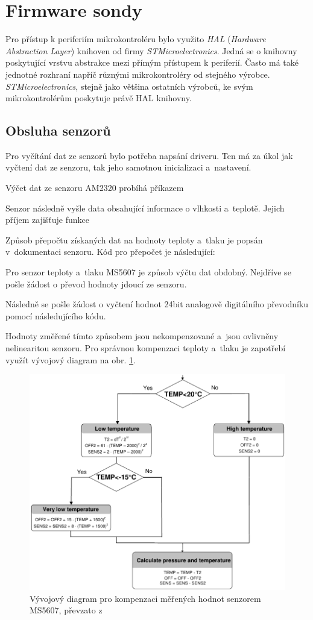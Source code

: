 \documentclass[twoside]{ctuthesis}
\theoremstyle{plain}
\theoremstyle{definition}
\theoremstyle{note}
\begin{document}
	\section{Firmware sondy}
	Pro přístup k periferiím mikrokontroléru bylo využito \textit{HAL} (\textit{Hardware Abstraction Layer}) knihoven od firmy \textit{STMicroelectronics}. Jedná se o knihovny poskytující vrstvu abstrakce mezi přímým přístupem k periferií. Často má také jednotné
	rozhraní napříč různými mikrokontroléry od stejného výrobce. \textit{STMicroelectronics}, stejně jako většina ostatních výrobců, ke svým mikrokontrolérům poskytuje právě HAL knihovny.

		\subsection{Obsluha senzorů}
		Pro vyčítání dat ze senzorů bylo potřeba napsání driveru. Ten má za úkol jak vyčtení dat ze senzoru, tak jeho samotnou inicializaci a~nastavení. 

		Výčet dat ze senzoru AM2320 probíhá příkazem
		

		Senzor následně vyšle data obsahující informace o vlhkosti a~teplotě. Jejich příjem zajišťuje funkce
		

		Způsob přepočtu získaných dat na hodnoty teploty a~tlaku je popsán v~dokumentaci senzoru. Kód pro přepočet je následující:
		

		Pro senzor teploty a~tlaku MS5607 je způsob výčtu dat obdobný. Nejdříve se pošle žádost o převod hodnoty jdoucí ze senzoru.
		
		Následně se pošle žádost o vyčtení hodnot 24bit analogově digitálního převodníku pomocí následujícího kódu.
		

		Hodnoty změřené tímto způsobem jsou nekompenzované a~jsou ovlivněny nelinearitou senzoru. Pro správnou kompenzaci teploty a~tlaku je zapotřebí využít vývojový diagram na obr. \ref{fig:ms5607:flowchart}.
		\begin{figure}
			\centering
			\includegraphics[width=.7\textwidth]{Figures/MS5607_flowchart.pdf}
			\caption{Vývojový diagram pro kompenzaci měřených hodnot senzorem MS5607, převzato z \cite{dsh_MS5607}}
			\label{fig:ms5607:flowchart}
		\end{figure}
\end{document}
